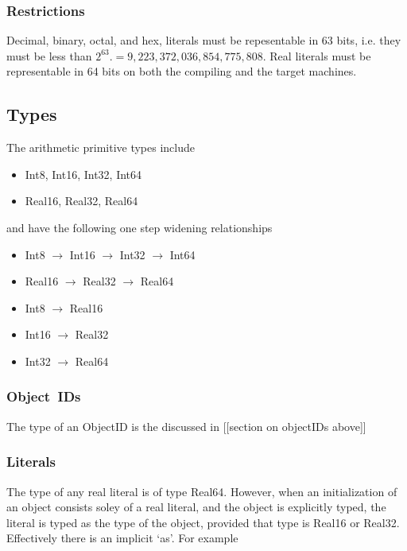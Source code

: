 \documentclass{article}%
\begin{document}
\subsubsection{Restrictions}

Decimal, binary, octal, and hex, literals must be repesentable in 63 bits,
i.e. they must be less than $2^{63}.=\allowbreak9,223,372,036,854,775,808$.
Real literals must be representable in 64 bits on both the compiling and the
target machines.

\subsection{Types}

The arithmetic primitive types include

\begin{itemize}
\item Int8, Int16, Int32, Int64

\item Real16, Real32, Real64
\end{itemize}

\noindent and have the following one step widening relationships

\begin{itemize}
\item Int8 $\rightarrow$ Int16 $\rightarrow$ Int32 $\rightarrow$ Int64

\item Real16 $\rightarrow$ Real32 $\rightarrow$ Real64

\item Int8 $\rightarrow$ Real16

\item Int16 $\rightarrow$ Real32

\item Int32 $\rightarrow$ Real64
\end{itemize}

\subsubsection{Object\ IDs}

The type of an ObjectID is the discussed in [[section on objectIDs above]]

\subsubsection{Literals}

The type of any real literal is of type Real64. However, when an
initialization of an object consists soley of a real literal, and the object
is explicitly typed, the literal is typed as the type of the object, provided
that type is Real16 or Real32. Effectively there is an implicit `as'. For example
\end{document}
